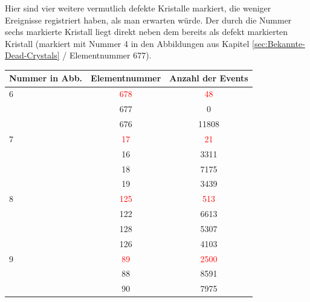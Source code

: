 \documentclass[a4paper,11pt,oneside,final,german,openbib,pdftex]{scrbook}
\begin{document}
{\begin{figure}[h!]
\end{figure}

Hier sind vier weitere vermutlich defekte Kristalle markiert, die weniger Ereignisse registriert haben, als man erwarten w\"urde. Der durch die Nummer sechs markierte Kristall liegt direkt neben dem bereits als defekt markierten Kristall (markiert mit Nummer 4 in den Abbildungen aus Kapitel \ref{sec:Bekannte-Dead-Crystals} / Elementnummer 677). 
 
 
 \begin{table}[h!]
 \begin{center}
 	
 \begin{tabular}{lcc}
 
 	
 	Nummer in Abb. & Elementnummer&Anzahl der Events \\
	 
 	\hline
 	6& \textcolor{red}{678} &\textcolor{red}{48} \\
 	 
 	 & 677&0 \\
 	
 	 & 676& 11808\\ 
 	
 	
 	\hline
 	7& \textcolor{red}{17} &\textcolor{red}{21} \\
 	
 	& 16 & 3311\\
 	
 	& 18& 7175 \\
 	
 	 & 19& 3439 \\
 	
 	\hline
 	
 	8 & \textcolor{red}{125} &\textcolor{red}{513} \\
 	
 	
 	 & 122& 6613\\
 	
 	 & 128 & 5307 \\
 	
 	& 126 & 4103 \\
 	
 	\hline
 	
 	9 & \textcolor{red}{89}& \textcolor{red}{2500}\\
 	
 	& 88& 8591\\
 	
 	&90&7975 \\
 	

\end{tabular}
\end{center}
\end{table}}
\end{document}
